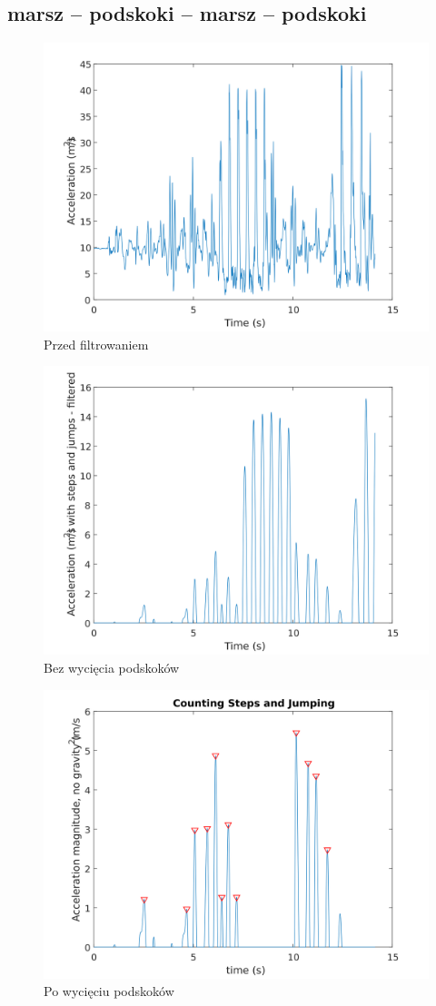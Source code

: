 \documentclass[a4paper, 12pt, titlepage]{article}
\begin{document}
        \subsection{marsz -- podskoki -- marsz -- podskoki}
            \begin{figure}[H]
                \centering
                \includegraphics[width=0.7\columnwidth]
                    {krok_dziala1f.png}
                \caption{Przed filtrowaniem}
            \end{figure}\noindent
            \begin{figure}[H]
                \centering
                \includegraphics[width=0.7\columnwidth]
                    {krok_dziala1a.png}
                \caption{Bez wycięcia podskoków}
            \end{figure}\noindent
            \begin{figure}[H]
                \centering
                \includegraphics[width=0.7\columnwidth]
                    {krok_dziala1b.png}
                \caption{Po wycięciu podskoków}
            \end{figure}\noindent
\end{document}
